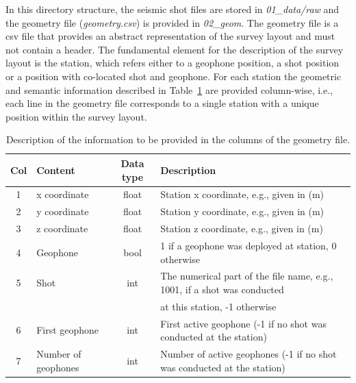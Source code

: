 \documentclass[a4paper,fleqn]{cas-sc}
\begin{document}
In this directory structure, the seismic shot files are stored in \textit{01\_data/raw} and the geometry file (\textit{geometry.csv}) is provided in \textit{02\_geom}.
The geometry file is a csv file that provides an abstract representation of the survey layout and must not contain a header. The fundamental element for the description of the survey layout is the station, which refers either to a geophone position, a shot position or a position with co-located shot and geophone. For each station the geometric and semantic information described in Table~\ref{tab:geometry} are provided column-wise, i.e., each line in the geometry file corresponds to a single station with a unique position within the survey layout. 
\begin{table}[pos=h]
    \caption{Description of the information to be provided in the columns of the geometry file.}
    \centering
    \begin{tabular}{clcl}
        \toprule
        Col & \textbf{Content} & \textbf{Data type} & \textbf{Description} \\
        \midrule
        1 & x coordinate & float & Station x coordinate, e.g., given in (m) \\ 
        2 & y coordinate & float & Station y coordinate, e.g., given in (m) \\ 
        3 & z coordinate & float & Station z coordinate, e.g., given in (m) \\ 
        4 & Geophone & bool & 1 if a geophone was deployed at station, 0 otherwise \\ 
        5 & Shot & int & The numerical part of the file name, e.g., 1001, if a shot was conducted \\
          & & & at this station, -1 otherwise \\ 
        6 & First geophone & int & First active geophone (-1 if no shot was conducted at the station) \\ 
        7 & Number of geophones & int & Number of active geophones (-1 if no shot was conducted at the station) \\
        \bottomrule
    \end{tabular}
    \label{tab:geometry}
\end{table}
\end{document}
